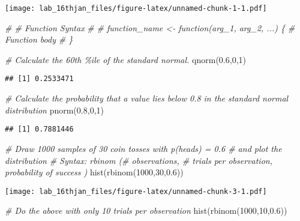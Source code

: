 \documentclass[
]{article}
\newenvironment{Shaded}{\begin{snugshade}}{\end{snugshade}}
\newcommand{\CommentTok}[1]{\textcolor[rgb]{0.56,0.35,0.01}{\textit{#1}}}
\newcommand{\DecValTok}[1]{\textcolor[rgb]{0.00,0.00,0.81}{#1}}
\newcommand{\FloatTok}[1]{\textcolor[rgb]{0.00,0.00,0.81}{#1}}
\newcommand{\FunctionTok}[1]{\textcolor[rgb]{0.00,0.00,0.00}{#1}}
\newcommand{\NormalTok}[1]{#1}
\begin{document}
\texttt{[image: lab\_16thjan\_files/figure-latex/unnamed-chunk-1-1.pdf]}

\begin{Shaded}
\begin{Highlighting}[]
\CommentTok{\# \# Function Syntax}
\CommentTok{\# }
\CommentTok{\# function\_name \textless{}{-} function(arg\_1, arg\_2, ...) \{}
\CommentTok{\#    Function body }
\CommentTok{\# \}}
\end{Highlighting}
\end{Shaded}

\begin{Shaded}
\begin{Highlighting}[]
\CommentTok{\# Calculate the 60th \%ile of the standard normal.}
\FunctionTok{qnorm}\NormalTok{(}\FloatTok{0.6}\NormalTok{,}\DecValTok{0}\NormalTok{,}\DecValTok{1}\NormalTok{)}
\end{Highlighting}
\end{Shaded}

\begin{verbatim}
## [1] 0.2533471
\end{verbatim}

\begin{Shaded}
\begin{Highlighting}[]
\CommentTok{\# Calculate the probability that a value lies below 0.8 in the standard normal distribution}
\FunctionTok{pnorm}\NormalTok{(}\FloatTok{0.8}\NormalTok{,}\DecValTok{0}\NormalTok{,}\DecValTok{1}\NormalTok{)}
\end{Highlighting}
\end{Shaded}

\begin{verbatim}
## [1] 0.7881446
\end{verbatim}

\begin{Shaded}
\begin{Highlighting}[]
\CommentTok{\# Draw 1000 samples of 30 coin tosses with p(heads) = 0.6 \# and plot the distribution}
\CommentTok{\# Syntax: rbinom (\# observations, \# trials per observation, probability of success )}
\FunctionTok{hist}\NormalTok{(}\FunctionTok{rbinom}\NormalTok{(}\DecValTok{1000}\NormalTok{,}\DecValTok{30}\NormalTok{,}\FloatTok{0.6}\NormalTok{))}
\end{Highlighting}
\end{Shaded}

\texttt{[image: lab\_16thjan\_files/figure-latex/unnamed-chunk-3-1.pdf]}

\begin{Shaded}
\begin{Highlighting}[]
\CommentTok{\# Do the above with only 10 trials per observation}
\FunctionTok{hist}\NormalTok{(}\FunctionTok{rbinom}\NormalTok{(}\DecValTok{1000}\NormalTok{,}\DecValTok{10}\NormalTok{,}\FloatTok{0.6}\NormalTok{))}
\end{Highlighting}
\end{Shaded}
\end{document}
